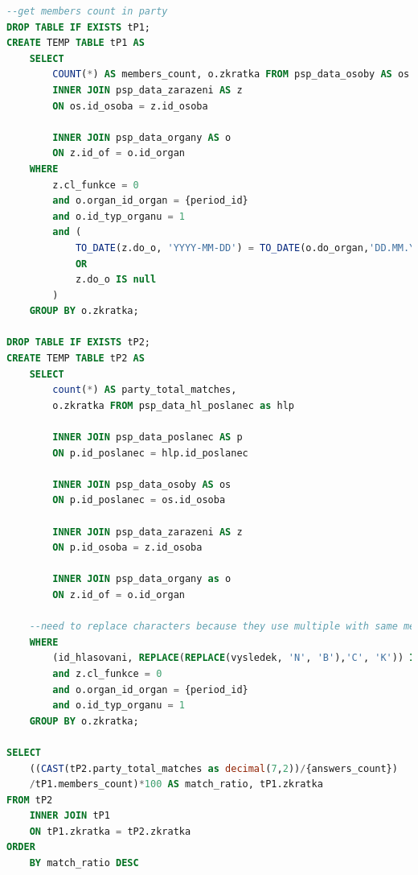 \begin{lstlisting}[language=SQL, caption={SQL dotaz na vyhledání shod uživatele se stranami}, label=code:sql-shoda-strany]
--get members count in party
DROP TABLE IF EXISTS tP1;
CREATE TEMP TABLE tP1 AS
    SELECT 
        COUNT(*) AS members_count, o.zkratka FROM psp_data_osoby AS os
        INNER JOIN psp_data_zarazeni AS z 
        ON os.id_osoba = z.id_osoba

        INNER JOIN psp_data_organy AS o
        ON z.id_of = o.id_organ
    WHERE 
        z.cl_funkce = 0
        and o.organ_id_organ = {period_id}
        and o.id_typ_organu = 1
        and (
            TO_DATE(z.do_o, 'YYYY-MM-DD') = TO_DATE(o.do_organ,'DD.MM.YYYY')
            OR 
            z.do_o IS null
        )
    GROUP BY o.zkratka;

DROP TABLE IF EXISTS tP2;
CREATE TEMP TABLE tP2 AS
    SELECT 
        count(*) AS party_total_matches, 
        o.zkratka FROM psp_data_hl_poslanec as hlp
        
        INNER JOIN psp_data_poslanec AS p
        ON p.id_poslanec = hlp.id_poslanec

        INNER JOIN psp_data_osoby AS os
        ON p.id_poslanec = os.id_osoba

        INNER JOIN psp_data_zarazeni AS z 
        ON p.id_osoba = z.id_osoba

        INNER JOIN psp_data_organy as o
        ON z.id_of = o.id_organ

    --need to replace characters because they use multiple with same meaning
    WHERE 
        (id_hlasovani, REPLACE(REPLACE(vysledek, 'N', 'B'),'C', 'K')) IN %s
        and z.cl_funkce = 0
        and o.organ_id_organ = {period_id}
        and o.id_typ_organu = 1
    GROUP BY o.zkratka;

SELECT 
    ((CAST(tP2.party_total_matches as decimal(7,2))/{answers_count})
    /tP1.members_count)*100 AS match_ratio, tP1.zkratka 
FROM tP2
    INNER JOIN tP1
    ON tP1.zkratka = tP2.zkratka
ORDER 
    BY match_ratio DESC
\end{lstlisting}


